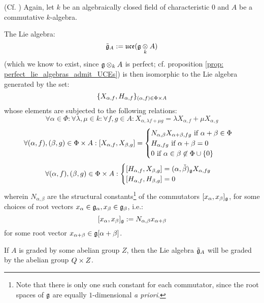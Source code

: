         \begin{theorem} \label{theorem: kassel_presentations_for_UCEs}
            (Cf. \cite[Definition 3.1 and Corollary 3.4]{kassel_universal_central_extensions_of_lie_algebras}) Again, let $k$ be an algebraically closed field of characteristic $0$ and $A$ be a commutative $k$-algebra. 

            The Lie algebra:
                $$\tilde{\g}_A := \uce(\g \tensor_k A)$$
            (which we know to exist, since $\g \tensor_k A$ is perfect; cf. proposition \ref{prop: perfect_lie_algebras_admit_UCEs}) is then isomorphic to the Lie algebra generated by the set:
                $$\{ X_{\alpha, f}, H_{\alpha, f} \}_{(\alpha, f) \in \Phi \x A}$$
            whose elements are subjected to the following relations:
                $$\forall \alpha \in \Phi: \forall \lambda, \mu \in k: \forall f, g \in A: X_{\alpha, \lambda f + \mu g} = \lambda X_{\alpha, f} + \mu X_{\alpha, g}$$
                $$
                    \forall (\alpha, f), (\beta, g) \in \Phi \x A: [X_{\alpha, f}, X_{\beta, g}] =
                    \begin{cases}
                        \text{$N_{\alpha, \beta} X_{\alpha + \beta, fg}$ if $\alpha + \beta \in \Phi$}
                        \\
                        \text{$H_{\alpha, fg}$ if $\alpha + \beta = 0$}
                        \\
                        \text{$0$ if $\alpha \in \beta \not \in \Phi \cup \{0\}$}
                    \end{cases}
                $$
                $$
                    \forall (\alpha, f), (\beta, g) \in \Phi \x A:
                    \begin{cases}
                        [H_{\alpha, f}, X_{\beta, g}] = (\alpha, \check{\beta})_{\g} X_{\alpha, fg}
                        \\
                        [H_{\alpha, f}, H_{\beta, g}] = 0
                    \end{cases}    
                $$
            wherein $N_{\alpha, \beta}$ are the structural constants\footnote{Note that there is only one such constant for each commutator, since the root spaces of $\mathfrak{g}$ are equally $1$-dimensional \textit{a priori}.} of the commutators $[x_{\alpha}, x_{\beta}]_{\mathfrak{g}}$, for some choices of root vectors $x_{\alpha} \in \mathfrak{g}_{\alpha}, x_{\beta} \in \mathfrak{g}_{\beta}$, i.e.:
                $$[x_{\alpha}, x_{\beta}]_{\mathfrak{g}} := N_{\alpha, \beta} x_{\alpha + \beta}$$
            for some root vector $x_{\alpha + \beta} \in \mathfrak{g}[\alpha + \beta]$.
        \end{theorem}
        \begin{corollary}
            If $A$ is graded by some abelian group $Z$, then the Lie algebra $\tilde{\mathfrak{g}}_A$ will be graded by the abelian group $Q \x Z$. 
        \end{corollary}

